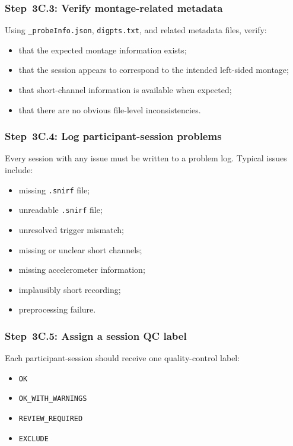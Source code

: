 \documentclass[11pt]{article}
\begin{document}
\subsubsection{Step~3C.3: Verify montage-related metadata}
Using \texttt{\_probeInfo.json}, \texttt{digpts.txt}, and related metadata files, verify:
\begin{itemize}
    \item that the expected montage information exists;
    \item that the session appears to correspond to the intended left-sided montage;
    \item that short-channel information is available when expected;
    \item that there are no obvious file-level inconsistencies.
\end{itemize}

\subsubsection{Step~3C.4: Log participant-session problems}
Every session with any issue must be written to a problem log.
Typical issues include:
\begin{itemize}
    \item missing \texttt{.snirf} file;
    \item unreadable \texttt{.snirf} file;
    \item unresolved trigger mismatch;
    \item missing or unclear short channels;
    \item missing accelerometer information;
    \item implausibly short recording;
    \item preprocessing failure.
\end{itemize}

\subsubsection{Step~3C.5: Assign a session QC label}
Each participant-session should receive one quality-control label:
\begin{itemize}
    \item \texttt{OK}
    \item \texttt{OK\_WITH\_WARNINGS}
    \item \texttt{REVIEW\_REQUIRED}
    \item \texttt{EXCLUDE}
\end{itemize}
\end{document}
